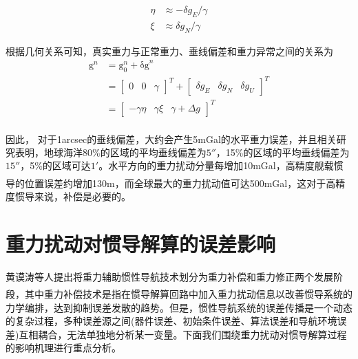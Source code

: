 \documentclass[12pt,a4,utf8]{article}
\newcommand{\upcite}[1]{\textsuperscript{\textsuperscript{\cite{#1}}}} %
\newcommand{\bmmathrm}[1]{\bm{\mathrm{#1}}}
\begin{document}
\begin{equation}
      \begin{aligned}
            \eta & \approx -\delta g_E / \gamma \\
            \xi  & \approx \delta g_N / \gamma
      \end{aligned}
      \label{equ_1}
\end{equation}

根据几何关系可知，真实重力与正常重力、垂线偏差和重力异常之间的关系为
\begin{equation}
      \begin{aligned}
            \bmmathrm{g}^n & = \bmmathrm{g}_0^n +  \bmmathrm{\delta g}^n               \\
                     & =\begin{bmatrix}
                              0 & 0 & \gamma
                        \end{bmatrix}^T +
            \begin{bmatrix}
                  \delta g_E & \delta g_N & \delta g_U
            \end{bmatrix}^T                       \\
                     & = \begin{bmatrix}
                               -\gamma\eta & \gamma\xi & \gamma + \Delta g
                         \end{bmatrix}^T
      \end{aligned}
      \label{equ_2}
\end{equation}

因此， 对于1arcsec的垂线偏差，大约会产生5mGal的水平重力误差\upcite{jekeli1994airborne}，并且相关研究表明，地球海洋80\%的区域的平均垂线偏差为$5''$，15\%的区域的平均垂线偏差为$15''$，5\%的区域可达$1'$。水平方向的重力扰动分量每增加10mGal，高精度舰载惯导的位置误差约增加130m\cite{Luxin2010}，而全球最大的重力扰动值可达500mGal\upcite{peshekhonov2020problem}，这对于高精度惯导来说，补偿是必要的。

\section{重力扰动对惯导解算的误差影响}
黄谟涛等人提出将重力辅助惯性导航技术划分为重力补偿和重力修正两个发展阶段\upcite{WHCH20240724001}，其中重力补偿技术是指在惯导解算回路中加入重力扰动信息以改善惯导系统的力学编排，达到抑制误差发散的趋势。但是，惯性导航系统的误差传播是一个动态的复杂过程，多种误差源之间(器件误差、初始条件误差、算法误差和导航环境误差)互相耦合，无法单独地分析某一变量。下面我们围绕重力扰动对惯导解算过程的影响机理进行重点分析。
\end{document}
